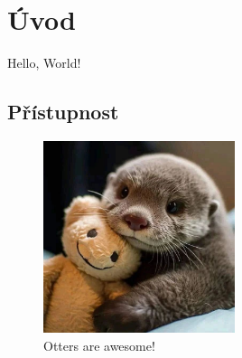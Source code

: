 \chapter{Úvod}

Hello, World!

\section{Přístupnost}


\begin{figure}
    \centering
    \includegraphics[width=0.5\textwidth]{./assets/figures/chapter-1/otter.jpg}
    \caption{Otters are awesome!}
\end{figure}
